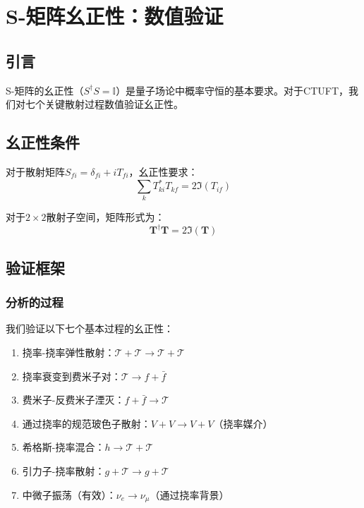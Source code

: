 \section{S-矩阵幺正性：数值验证}
\label{sec:unitarity}

\subsection{引言}

S-矩阵的幺正性（$S^\dagger S = \mathbb{I}$）是量子场论中概率守恒的基本要求。对于CTUFT，我们对七个关键散射过程数值验证幺正性。

\subsection{幺正性条件}

对于散射矩阵$S_{fi} = \delta_{fi} + i T_{fi}$，幺正性要求：
\begin{equation}
    \sum_k T^*_{ki} T_{kf} = 2 \Im(T_{if})
\end{equation}

对于$2 \times 2$散射子空间，矩阵形式为：
\begin{equation}
    \mathbf{T}^\dagger \mathbf{T} = 2 \Im(\mathbf{T})
\end{equation}

\subsection{验证框架}

\subsubsection{分析的过程}

我们验证以下七个基本过程的幺正性：

\begin{enumerate}
    \item 挠率-挠率弹性散射：$\mathcal{T} + \mathcal{T} \to \mathcal{T} + \mathcal{T}$
    \item 挠率衰变到费米子对：$\mathcal{T} \to f + \bar{f}$
    \item 费米子-反费米子湮灭：$f + \bar{f} \to \mathcal{T}$
    \item 通过挠率的规范玻色子散射：$V + V \to V + V$（挠率媒介）
    \item 希格斯-挠率混合：$h \to \mathcal{T} + \mathcal{T}$
    \item 引力子-挠率散射：$g + \mathcal{T} \to g + \mathcal{T}$
    \item 中微子振荡（有效）：$\nu_e \to \nu_\mu$（通过挠率背景）
\end{enumerate}

